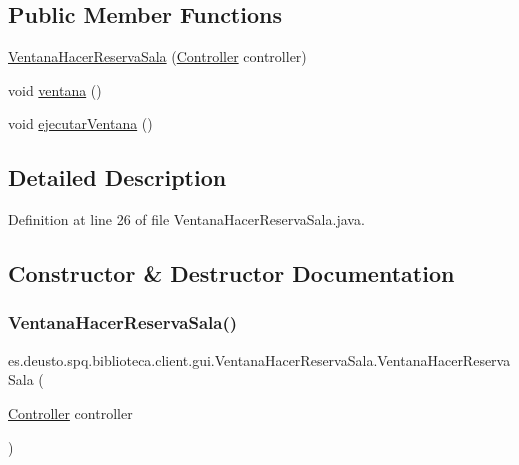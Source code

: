 \subsection*{Public Member Functions}
\begin{DoxyCompactItemize}
\item 
\mbox{\hyperlink{classes_1_1deusto_1_1spq_1_1biblioteca_1_1client_1_1gui_1_1_ventana_hacer_reserva_sala_a312e60fcf20cddaffeb9797a117c5cb9}{Ventana\+Hacer\+Reserva\+Sala}} (\mbox{\hyperlink{classes_1_1deusto_1_1spq_1_1biblioteca_1_1controller_1_1_controller}{Controller}} controller)
\item 
void \mbox{\hyperlink{classes_1_1deusto_1_1spq_1_1biblioteca_1_1client_1_1gui_1_1_ventana_hacer_reserva_sala_aa5d6c1cf5f1017a242410ad04c5cc876}{ventana}} ()
\item 
void \mbox{\hyperlink{classes_1_1deusto_1_1spq_1_1biblioteca_1_1client_1_1gui_1_1_ventana_hacer_reserva_sala_aa0a71df04faefeef13b6b7ed91eff04f}{ejecutar\+Ventana}} ()
\end{DoxyCompactItemize}


\subsection{Detailed Description}


Definition at line 26 of file Ventana\+Hacer\+Reserva\+Sala.\+java.



\subsection{Constructor \& Destructor Documentation}
\mbox{\label{classes_1_1deusto_1_1spq_1_1biblioteca_1_1client_1_1gui_1_1_ventana_hacer_reserva_sala_a312e60fcf20cddaffeb9797a117c5cb9}} 
\subsubsection{\texorpdfstring{Ventana\+Hacer\+Reserva\+Sala()}{VentanaHacerReservaSala()}}
{\footnotesize\ttfamily es.\+deusto.\+spq.\+biblioteca.\+client.\+gui.\+Ventana\+Hacer\+Reserva\+Sala.\+Ventana\+Hacer\+Reserva\+Sala (\begin{DoxyParamCaption}\item[{\mbox{\hyperlink{classes_1_1deusto_1_1spq_1_1biblioteca_1_1controller_1_1_controller}{Controller}}}]{controller }\end{DoxyParamCaption})}

